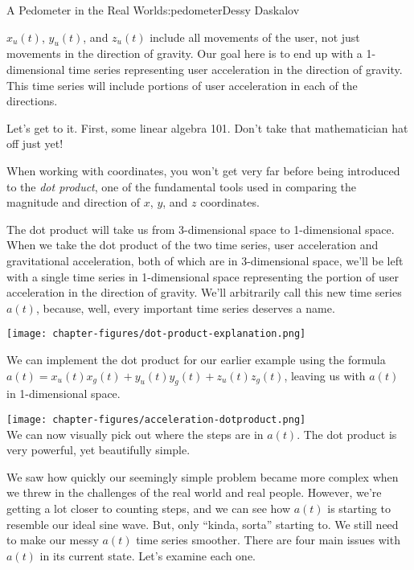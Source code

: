 \begin{aosachapter}{A Pedometer in the Real World}{s:pedometer}{Dessy Daskalov}
\label{isolating-user-acceleration-in-the-direction-of-gravity}

$x_{u}(t)$, $y_{u}(t)$, and $z_{u}(t)$ include all movements of the
user, not just movements in the direction of gravity. Our goal here is
to end up with a 1-dimensional time series representing user
acceleration in the direction of gravity. This time series will include
portions of user acceleration in each of the directions.

Let's get to it. First, some linear algebra 101. Don't take that
mathematician hat off just yet!

\label{the-dot-product}

When working with coordinates, you won't get very far before being
introduced to the \emph{dot product}, one of the fundamental tools used
in comparing the magnitude and direction of $x$, $y$, and $z$
coordinates.

The dot product will take us from 3-dimensional space to 1-dimensional
space. When we take the dot product of the two time series, user
acceleration and gravitational acceleration, both of which are in
3-dimensional space, we'll be left with a single time series in
1-dimensional space representing the portion of user acceleration in the
direction of gravity. We'll arbitrarily call this new time series
$a(t)$, because, well, every important time series deserves a name.

\texttt{[image: chapter-figures/dot-product-explanation.png]}\\

\label{implementing-the-dot-product}

We can implement the dot product for our earlier example using the
formula $a(t) = x_{u}(t)x_{g}(t) + y_{u}(t)y_{g}(t) + z_{u}(t)z_{g}(t)$,
leaving us with $a(t)$ in 1-dimensional space.

\texttt{[image: chapter-figures/acceleration-dotproduct.png]}\\ We can
now visually pick out where the steps are in $a(t)$. The dot product is
very powerful, yet beautifully simple.

\label{solutions-in-the-real-world}

We saw how quickly our seemingly simple problem became more complex when
we threw in the challenges of the real world and real people. However,
we're getting a lot closer to counting steps, and we can see how $a(t)$
is starting to resemble our ideal sine wave. But, only ``kinda, sorta''
starting to. We still need to make our messy $a(t)$ time series
smoother. There are four main issues with $a(t)$ in its current state.
Let's examine each one.


\end{aosachapter}
